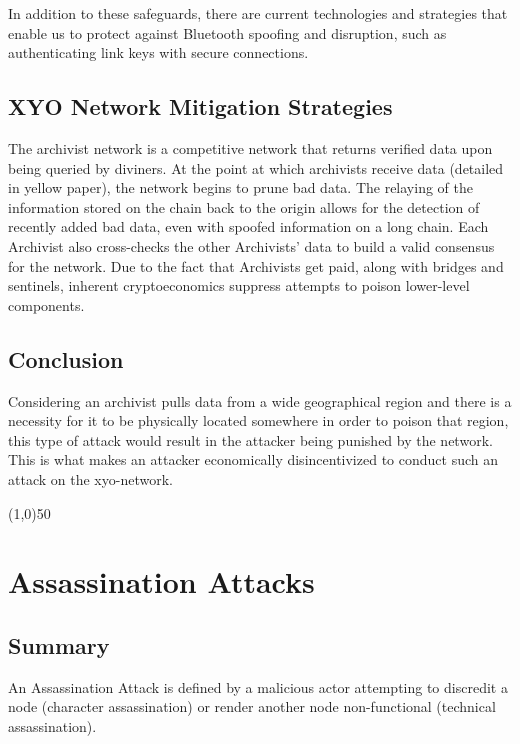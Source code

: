 \documentclass{article}
\begin{document}
In addition to these safeguards, there are current technologies and strategies that enable us to protect against Bluetooth spoofing and disruption, such as authenticating link keys with secure connections. \cite{dunning-bluetooth}

\subsection{XYO Network Mitigation Strategies}
The \Gls{archivist} network is a competitive network that returns verified data upon being queried by \Glspl{diviner}. At the point at which \Glspl{archivist} receive data (detailed in yellow paper), the network begins to prune bad data. The relaying of the information stored on the chain back to the origin allows for the detection of recently added bad data, even with spoofed information on a long chain. Each Archivist also cross-checks the other Archivists' data to build a valid consensus for the network. Due to the fact that Archivists get paid, along with \Glspl{bridge} and \Glspl{sentinel}, inherent \gls{cryptoeconomics} suppress attempts to poison lower-level components.

\subsection{Conclusion}
Considering an \Gls{archivist} pulls data from a wide geographical region and there is a necessity for it to be physically located somewhere in order to poison that region, this type of attack would result in the attacker being punished by the network. This is what makes an attacker economically disincentivized to conduct such an attack on the \Gls{xyo-network}.  

\begin{center}
\line(1,0){50}
\end{center}

\section{Assassination Attacks}

\subsection{Summary}

An Assassination Attack is defined by a malicious actor attempting to discredit a node (character assassination) or render another node non-functional (technical assassination).
\end{document}
